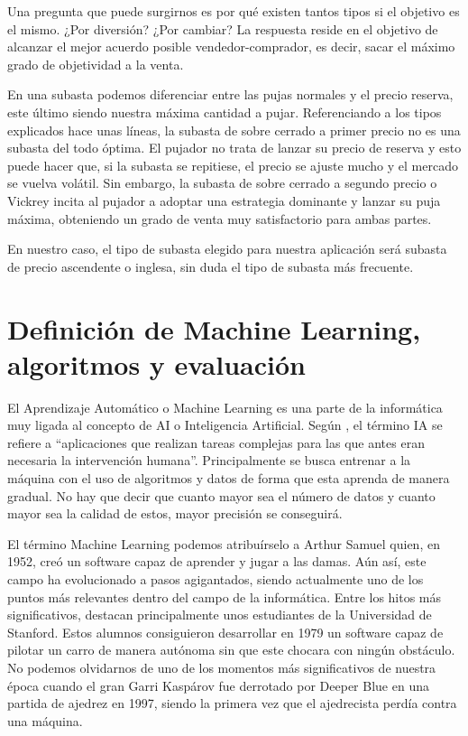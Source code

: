 	Una pregunta que puede surgirnos es por qué existen tantos tipos si el objetivo es el mismo. ¿Por diversión? ¿Por cambiar? La respuesta reside en el objetivo de alcanzar el mejor acuerdo posible vendedor-comprador, es decir, sacar el máximo grado de objetividad a la venta. 
	
	En una subasta podemos diferenciar entre las pujas normales y el precio reserva, este último siendo nuestra máxima cantidad a pujar. Referenciando a los tipos explicados hace unas líneas, la subasta de sobre cerrado a primer precio no es una subasta del todo óptima. El pujador no trata de lanzar su precio de reserva y esto puede hacer que, si la subasta se repitiese, el precio se ajuste mucho y el mercado se vuelva volátil. Sin embargo, la subasta de sobre cerrado a segundo precio o Vickrey incita al pujador a adoptar una estrategia dominante y lanzar su puja máxima, obteniendo un grado de venta muy satisfactorio para ambas partes.
	
	En nuestro caso, el tipo de subasta elegido para nuestra aplicación será subasta de precio ascendente o inglesa, sin duda el tipo de subasta más frecuente.
	
	

\section{Definición de Machine Learning, algoritmos y evaluación}

	El Aprendizaje Automático o Machine Learning es una parte de la informática muy ligada al concepto de AI o Inteligencia Artificial. Según \cite{oracle:homepage}, el término IA se refiere a ``aplicaciones que realizan tareas complejas para las que antes eran necesaria la intervención humana''. Principalmente se busca entrenar a la máquina con el uso de algoritmos y datos de forma que esta aprenda de manera gradual. No hay que decir que cuanto mayor sea el número de datos y cuanto mayor sea la calidad de estos, mayor precisión se conseguirá. 
	
	El término Machine Learning podemos atribuírselo a Arthur Samuel quien, en 1952, creó un software capaz de aprender y jugar a las damas. Aún así, este campo ha evolucionado a pasos agigantados, siendo actualmente uno de los puntos más relevantes dentro del campo de la informática. Entre los hitos más significativos, destacan principalmente unos estudiantes de la Universidad de Stanford. Estos alumnos consiguieron desarrollar en 1979 un software capaz de pilotar un carro de manera autónoma sin que este chocara con ningún obstáculo.  No podemos olvidarnos de uno de los momentos más significativos de nuestra época cuando el gran Garri Kaspárov fue derrotado por Deeper Blue en una partida de ajedrez en 1997, siendo la primera vez que el ajedrecista perdía contra una máquina.
	
